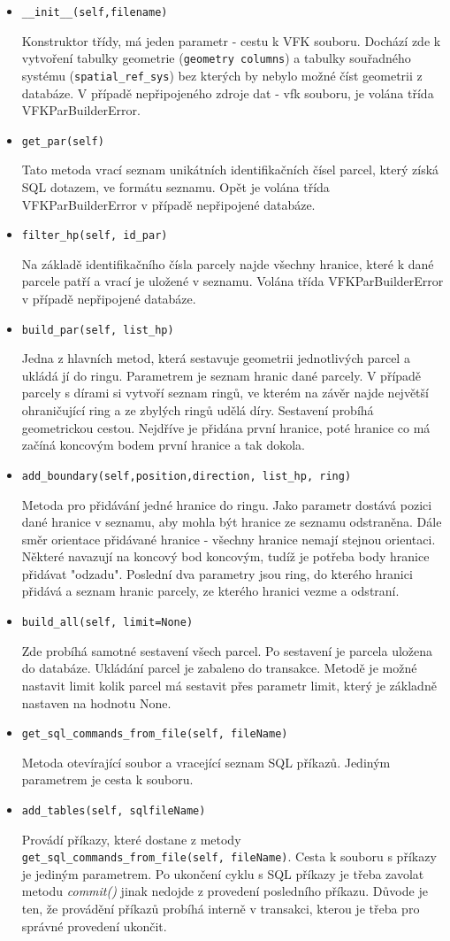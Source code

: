\begin{itemize}
\item \verb|__init__(self,filename)|
		
Konstruktor třídy, má jeden parametr - cestu k VFK souboru. Dochází zde k vytvoření tabulky geometrie (\verb|geometry columns|) a tabulky souřadného systému (\verb|spatial_ref_sys|) bez kterých by nebylo možné číst geometrii z databáze. V případě nepřipojeného zdroje dat - vfk souboru, je volána třída VFKParBuilderError.
\item \verb|get_par(self)|
		
Tato metoda vrací seznam unikátních identifikačních čísel parcel, který získá SQL dotazem, ve formátu seznamu. Opět je volána třída VFKParBuilderError v případě nepřipojené databáze.
\item \verb|filter_hp(self, id_par)|

Na základě identifikačního čísla parcely najde všechny hranice, které k dané parcele patří a vrací je uložené v seznamu. Volána třída VFKParBuilderError v případě nepřipojené databáze.
\item \verb|build_par(self, list_hp)|

Jedna z hlavních metod, která sestavuje geometrii jednotlivých parcel a ukládá jí do ringu. Parametrem je seznam hranic dané parcely. V případě parcely s dírami si vytvoří seznam ringů, ve kterém na závěr najde největší ohraničující ring a ze zbylých ringů udělá díry. Sestavení probíhá geometrickou cestou. Nejdříve je přidána první hranice, poté hranice co má začíná koncovým bodem první hranice a tak dokola.
\item \verb|add_boundary(self,position,direction, list_hp, ring)|

Metoda pro přidávání jedné hranice do ringu. Jako parametr dostává pozici dané hranice v seznamu, aby mohla být hranice ze seznamu odstraněna. Dále směr orientace přidávané hranice - všechny hranice nemají stejnou orientaci. Některé navazují na koncový bod koncovým, tudíž je potřeba body hranice přidávat "odzadu". Poslední dva parametry jsou ring, do kterého hranici přidává a seznam hranic parcely, ze kterého hranici vezme a odstraní. 
\item \verb|build_all(self, limit=None)|

Zde probíhá samotné sestavení všech parcel. Po sestavení je parcela uložena do databáze. Ukládání parcel je zabaleno do transakce. Metodě je možné nastavit limit kolik parcel má sestavit přes parametr limit, který je základně nastaven na hodnotu None.
\item \verb|get_sql_commands_from_file(self, fileName)|

Metoda otevírající soubor a vracející seznam SQL příkazů. Jediným parametrem je cesta k souboru.
\item \verb|add_tables(self, sqlfileName)|

Provádí příkazy, které dostane z metody \verb|get_sql_commands_from_file(self, fileName)|. Cesta k souboru s příkazy je jediným parametrem. Po ukončení cyklu s SQL příkazy je třeba zavolat metodu \textit{commit()} jinak nedojde z provedení posledního příkazu. Důvode je ten, že provádění příkazů probíhá interně v transakci, kterou je třeba pro správné provedení ukončit.
\end{itemize}
